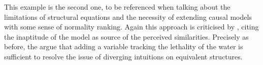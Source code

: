 \documentclass[11pt,a4paper]{book}
\theoremstyle{definition}
\theoremstyle{definition}
\theoremstyle{definition}
\theoremstyle{remark}
\begin{document}
This example is the second one, to be referenced when talking about the limitations of structural equations and the necessity of extending causal models with some sense of normality ranking.
Again this approach is criticised by \parencite{blanchard2017cause}, citing the inaptitude of the model as source of the perceived similarities.
Precisely as before, the argue that adding a variable tracking the lethality of the water is sufficient to resolve the issue of diverging intuitions on equivalent structures. 
%
%
%	
%	
%	
%    
%    
%
\end{document}
